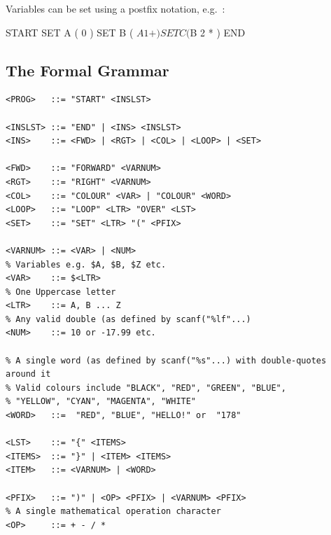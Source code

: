 \noindent Variables can be set using a postfix notation, e.g.~:
\begin{codesnippet}
START
   SET A ( 0 )
   SET B ( $A 1 + )
   SET C ( $B 2 * )
END
\end{codesnippet}

\subsection*{The Formal Grammar}
{\samepage
\begin{verbatim}
<PROG>   ::= "START" <INSLST>

<INSLST> ::= "END" | <INS> <INSLST>
<INS>    ::= <FWD> | <RGT> | <COL> | <LOOP> | <SET>

<FWD>    ::= "FORWARD" <VARNUM>
<RGT>    ::= "RIGHT" <VARNUM>
<COL>    ::= "COLOUR" <VAR> | "COLOUR" <WORD>
<LOOP>   ::= "LOOP" <LTR> "OVER" <LST>
<SET>    ::= "SET" <LTR> "(" <PFIX>

<VARNUM> ::= <VAR> | <NUM>
% Variables e.g. $A, $B, $Z etc.
<VAR>    ::= $<LTR>
% One Uppercase letter
<LTR>    ::= A, B ... Z
% Any valid double (as defined by scanf("%lf"...)
<NUM>    ::= 10 or -17.99 etc.

% A single word (as defined by scanf("%s"...) with double-quotes around it
% Valid colours include "BLACK", "RED", "GREEN", "BLUE",
% "YELLOW", "CYAN", "MAGENTA", "WHITE"
<WORD>   ::=  "RED", "BLUE", "HELLO!" or  "178"

<LST>    ::= "{" <ITEMS>
<ITEMS>  ::= "}" | <ITEM> <ITEMS>
<ITEM>   ::= <VARNUM> | <WORD>

<PFIX>   ::= ")" | <OP> <PFIX> | <VARNUM> <PFIX>
% A single mathematical operation character
<OP>     ::= + - / *
\end{verbatim}
}

